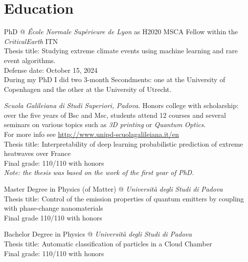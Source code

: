 \documentclass[11pt, a4 paper]{article}
\begin{document}
\section*{Education}
  \begin{description}[style=multiline,leftmargin=3cm,align=right]
    \item[2021-2024]
      PhD @ \emph{\'Ecole Normale Supérieure de Lyon} as H2020 MSCA Fellow within the \emph{CriticalEarth} ITN \\
      Thesis title: Studying extreme climate events using machine learning and rare event algorithms. \\
      Defense date: October 15, 2024 \\
      During my PhD I did two 3-month Secondments: one at the University of Copenhagen and the other at the University of Utrecht.
    \item[2016-2022]
      \emph{Scuola Galileiana di Studi Superiori, Padova}. Honors college with scholarship: over the five years of Bsc and Msc, students attend 12 courses and several seminars on various topics such as \emph{3D printing} or \emph{Quantum Optics}. \\ For more info see \url{http://www.unipd-scuolagalileiana.it/en} \\
      Thesis title: Interpretability of deep learning probabilistic prediction of extreme heatwaves over France \\
      Final grade: 110/110 with honors \\
      \emph{Note: the thesis was based on the work of the first year of PhD.}
    \item[2019-2021]
      Master Degree in Physics (of Matter) @ \emph{Università degli Studi di Padova} \\
      Thesis title: Control of the emission properties of quantum emitters by coupling with phase-change nanomaterials \\
      Final grade 110/110 with honors
    \item[2016-2019]
      Bachelor Degree in Physics @ \emph{Università degli Studi di Padova} \\
      Thesis title: Automatic classification of particles in a Cloud Chamber \\
      Final grade: 110/110 with honors
  \end{description}
\end{document}
